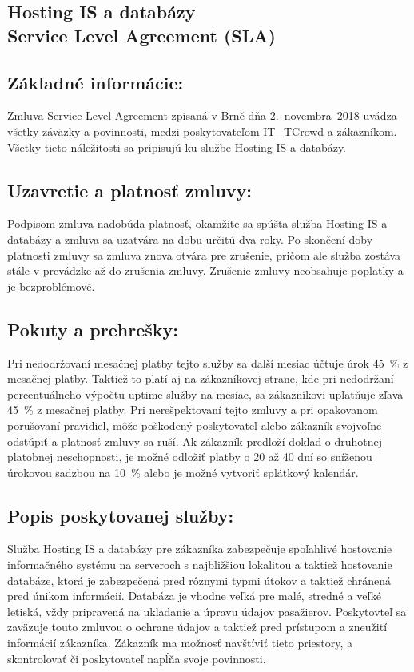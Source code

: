 \documentclass[a4paper, 11pt]{article}
\begin{document}
\setcounter{page}{1}
\begin{center}

\section*{ \Large Hosting IS a databázy \\ Service Level Agreement (SLA)}
\hfill
\subsection*{Základné informácie:}
Zmluva Service Level Agreement zpísaná v Brně dňa 2.~novembra~2018 uvádza všetky záväzky a povinnosti, medzi poskytovateľom IT\_TCrowd a zákazníkom. Všetky tieto náležitosti sa pripisujú ku službe Hosting IS a databázy.

\subsection*{Uzavretie a platnosť zmluvy:}
Podpisom zmluva nadobúda platnosť, okamžite sa spúšťa služba Hosting IS a databázy a zmluva sa uzatvára na dobu určitú dva roky. Po skončení doby platnosti zmluvy sa zmluva znova otvára 
pre zrušenie, pričom ale služba zostáva stále v prevádzke až do zrušenia zmluvy. Zrušenie zmluvy neobsahuje poplatky a je bezproblémové.

\subsection*{Pokuty a prehrešky:}
Pri nedodržovaní mesačnej platby tejto služby sa ďalší mesiac účtuje úrok 45~\% z mesačnej platby. Taktiež to platí aj na zákazníkovej strane, kde pri nedodržaní percentuálneho výpočtu uptime
služby na mesiac, sa zákazníkovi upľatňuje zľava 45~\% z mesačnej platby. Pri nerešpektovaní tejto zmluvy a pri opakovanom porušovaní pravidiel, môže poškodený poskytovateľ alebo zákazník svojvoľne
odstúpiť a platnosť zmluvy sa ruší. Ak zákazník predloží doklad o druhotnej platobnej neschopnosti, je možné odložiť platby o 20 až 40 dní so sníženou úrokovou sadzbou na 10~\% alebo je možné vytvoriť splátkový kalendár. 

\subsection*{Popis poskytovanej služby:}
Služba Hosting IS a databázy pre zákazníka zabezpečuje spoľahlivé hosťovanie informačného systému na serveroch s najbližšiou lokalitou a taktiež hosťovanie databáze, ktorá je zabezpečená
pred rôznymi typmi útokov a taktiež chránená pred únikom informácií. Databáza je vhodne veľká pre malé, stredné a veľké letiská, vždy pripravená na ukladanie a úpravu údajov pasažierov.
Poskytovteľ sa zaväzuje touto zmluvou o ochrane údajov a taktiež pred prístupom a zneužití informácií zákazníka. Zákazník ma možnosť navštíviť tieto priestory, a skontrolovať či poskytovateľ napĺňa svoje povinnosti.


\end{center}
\end{document}
